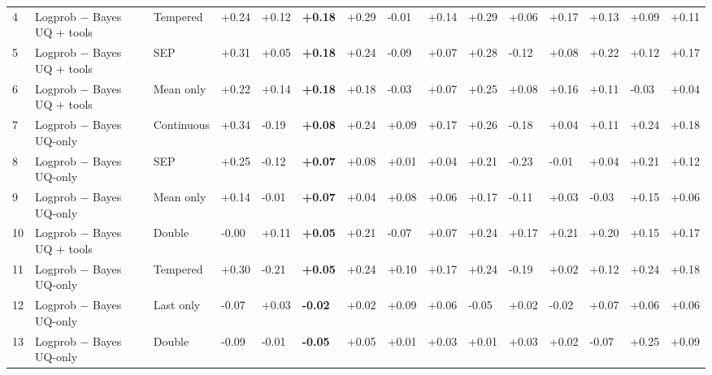 \documentclass[10pt,a4paper]{article}
\begin{document}
\begin{longtable}{@{}R{8.000mm}L{38.000mm}L{30.000mm}C{14.000mm}C{14.000mm}C{14.000mm}C{14.000mm}C{14.000mm}C{14.000mm}C{14.000mm}C{14.000mm}C{14.000mm}C{14.000mm}C{14.000mm}C{14.000mm}@{}}
4 & Logprob \ensuremath{-} Bayes UQ + tools & Tempered & +0.24 & +0.12 & \textbf{+0.18} & +0.29 & -0.01 & +0.14 & +0.29 & +0.06 & +0.17 & +0.13 & +0.09 & +0.11 \\
5 & Logprob \ensuremath{-} Bayes UQ + tools & SEP & +0.31 & +0.05 & \textbf{+0.18} & +0.24 & -0.09 & +0.07 & +0.28 & -0.12 & +0.08 & +0.22 & +0.12 & +0.17 \\
6 & Logprob \ensuremath{-} Bayes UQ + tools & Mean only & +0.22 & +0.14 & \textbf{+0.18} & +0.18 & -0.03 & +0.07 & +0.25 & +0.08 & +0.16 & +0.11 & -0.03 & +0.04 \\
7 & Logprob \ensuremath{-} Bayes UQ-only & Continuous & +0.34 & -0.19 & \textbf{+0.08} & +0.24 & +0.09 & +0.17 & +0.26 & -0.18 & +0.04 & +0.11 & +0.24 & +0.18 \\
8 & Logprob \ensuremath{-} Bayes UQ-only & SEP & +0.25 & -0.12 & \textbf{+0.07} & +0.08 & +0.01 & +0.04 & +0.21 & -0.23 & -0.01 & +0.04 & +0.21 & +0.12 \\
9 & Logprob \ensuremath{-} Bayes UQ-only & Mean only & +0.14 & -0.01 & \textbf{+0.07} & +0.04 & +0.08 & +0.06 & +0.17 & -0.11 & +0.03 & -0.03 & +0.15 & +0.06 \\
10 & Logprob \ensuremath{-} Bayes UQ + tools & Double & -0.00 & +0.11 & \textbf{+0.05} & +0.21 & -0.07 & +0.07 & +0.24 & +0.17 & +0.21 & +0.20 & +0.15 & +0.17 \\
11 & Logprob \ensuremath{-} Bayes UQ-only & Tempered & +0.30 & -0.21 & \textbf{+0.05} & +0.24 & +0.10 & +0.17 & +0.24 & -0.19 & +0.02 & +0.12 & +0.24 & +0.18 \\
12 & Logprob \ensuremath{-} Bayes UQ-only & Last only & -0.07 & +0.03 & \textbf{-0.02} & +0.02 & +0.09 & +0.06 & -0.05 & +0.02 & -0.02 & +0.07 & +0.06 & +0.06 \\
13 & Logprob \ensuremath{-} Bayes UQ-only & Double & -0.09 & -0.01 & \textbf{-0.05} & +0.05 & +0.01 & +0.03 & +0.01 & +0.03 & +0.02 & -0.07 & +0.25 & +0.09 \\
\end{longtable}
\endgroup
\Needspace{40mm}
\Needspace{40mm}
\end{document}
